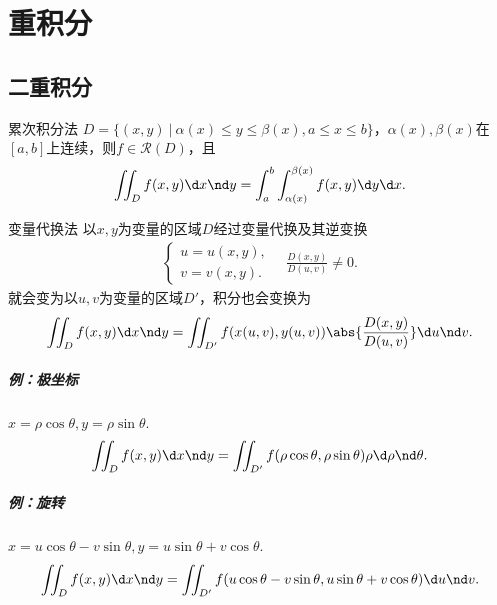 \chapter{重积分}
\section{二重积分}
\begin{theorem}{累次积分法}{}
	$D=\{(x,y)~|~\alpha(x)\leqslant y\leqslant\beta(x),a\leqslant x\leqslant b\}$，$\alpha(x),\beta(x)$在$[a,b]$上连续，则$f\in\mathscr R(D)$，且
	\[
		\iint_Df(x,y)\d x\nd y=\int_a^b\int_{\alpha(x)}^{\beta(x)}f(x,y)\d y\d x.
	\]
\end{theorem}
\begin{theorem}{变量代换法}{}
	以$x,y$为变量的区域$D$经过变量代换及其逆变换
	\begin{align*}
		\begin{cases}
			u=u(x,y), \\
			v=v(x,y).
		\end{cases}
		\quad\frac{D(x,y)}{D(u,v)}\neq 0.
	\end{align*}
	就会变为以$u,v$为变量的区域$D'$，积分也会变换为
	\[
		\iint_Df(x,y)\d x\nd y=\iint_{D'}f(x(u,v),y(u,v))\abs{\frac{D(x,y)}{D(u,v)}}\d u\nd v.
	\]
\end{theorem}
\paragraph{例：极坐标}$x=\rho\cos\theta,y=\rho\sin\theta.$
\[
	\iint_Df(x,y)\d x\nd y=\iint_{D'}f(\rho\cos\theta,\rho\sin\theta)\rho\d\rho\nd\theta.
\]
\paragraph{例：旋转}$x=u\cos\theta-v\sin\theta,y=u\sin\theta+v\cos\theta.$
\[
	\iint_Df(x,y)\d x\nd y=\iint_{D'}f(u\cos\theta-v\sin\theta,u\sin\theta+v\cos\theta)\d u\nd v.
\]
